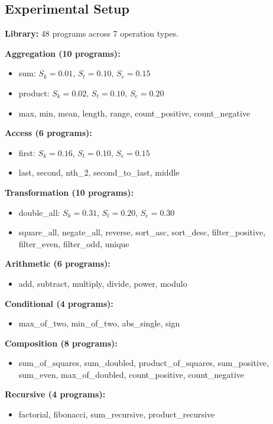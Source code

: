 \documentclass[twocolumn,10pt]{article}
\theoremstyle{definition}
\theoremstyle{remark}
\newcommand{\Sk}{S_k}
\newcommand{\St}{S_t}
\newcommand{\Se}{S_e}
\begin{document}
\subsection{Experimental Setup}

\textbf{Library:} 48 programs across 7 operation types.

\textbf{Aggregation (10 programs):}
\begin{itemize}
\item sum: $\Sk=0.01$, $\St=0.10$, $\Se=0.15$
\item product: $\Sk=0.02$, $\St=0.10$, $\Se=0.20$
\item max, min, mean, length, range, count\_positive, count\_negative
\end{itemize}

\textbf{Access (6 programs):}
\begin{itemize}
\item first: $\Sk=0.16$, $\St=0.10$, $\Se=0.15$
\item last, second, nth\_2, second\_to\_last, middle
\end{itemize}

\textbf{Transformation (10 programs):}
\begin{itemize}
\item double\_all: $\Sk=0.31$, $\St=0.20$, $\Se=0.30$
\item square\_all, negate\_all, reverse, sort\_asc, sort\_desc, filter\_positive, filter\_even, filter\_odd, unique
\end{itemize}

\textbf{Arithmetic (6 programs):}
\begin{itemize}
\item add, subtract, multiply, divide, power, modulo
\end{itemize}

\textbf{Conditional (4 programs):}
\begin{itemize}
\item max\_of\_two, min\_of\_two, abs\_single, sign
\end{itemize}

\textbf{Composition (8 programs):}
\begin{itemize}
\item sum\_of\_squares, sum\_doubled, product\_of\_squares, sum\_positive, sum\_even, max\_of\_doubled, count\_positive, count\_negative
\end{itemize}

\textbf{Recursive (4 programs):}
\begin{itemize}
\item factorial, fibonacci, sum\_recursive, product\_recursive
\end{itemize}
\end{document}
